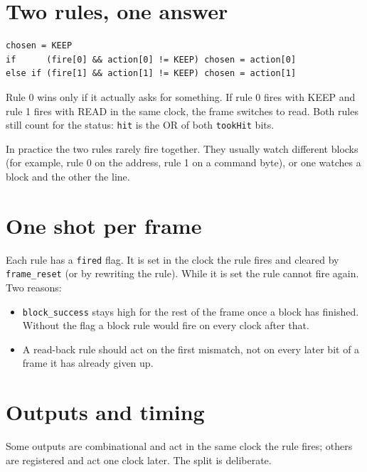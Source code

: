 \documentclass[11pt,a4paper]{article}
\newcommand{\sig}[1]{\texttt{#1}}
\begin{document}
\section{Two rules, one answer}

\begin{lstlisting}
chosen = KEEP
if      (fire[0] && action[0] != KEEP) chosen = action[0]
else if (fire[1] && action[1] != KEEP) chosen = action[1]
\end{lstlisting}

Rule 0 wins only if it actually asks for something. If rule 0 fires with KEEP and rule 1 fires with READ in the same clock, the frame switches to read. Both rules still count for the status: \sig{hit} is the OR of both \sig{tookHit} bits.

In practice the two rules rarely fire together. They usually watch different blocks (for example, rule 0 on the address, rule 1 on a command byte), or one watches a block and the other the line.

\section{One shot per frame}

Each rule has a \sig{fired} flag. It is set in the clock the rule fires and cleared by \sig{frame\_reset} (or by rewriting the rule). While it is set the rule cannot fire again. Two reasons:

\begin{itemize}
\item \sig{block\_success} stays high for the rest of the frame once a block has finished. Without the flag a block rule would fire on every clock after that.
\item A read-back rule should act on the first mismatch, not on every later bit of a frame it has already given up.
\end{itemize}

\section{Outputs and timing}\label{sec:timing}

Some outputs are combinational and act in the same clock the rule fires; others are registered and act one clock later. The split is deliberate.
\end{document}
